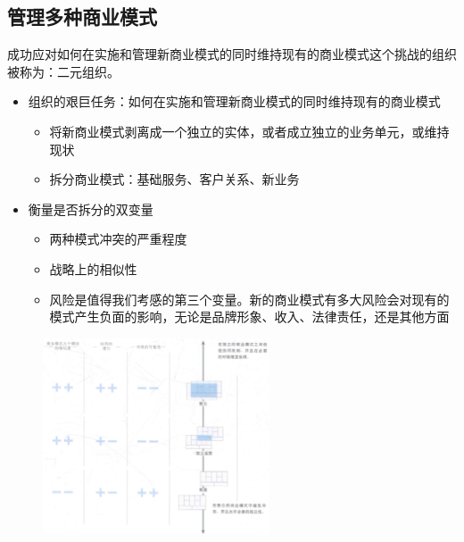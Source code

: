 \subsection{管理多种商业模式}
成功应对如何在实施和管理新商业模式的同时维持现有的商业模式这个挑战的组织被称为：二元组织。

\begin{itemize}
    \item 组织的艰巨任务：如何在实施和管理新商业模式的同时维持现有的商业模式
    \begin{itemize}
        \item 将新商业模式剥离成一个独立的实体，或者成立独立的业务单元，或维持现状
        \item 拆分商业模式：基础服务、客户关系、新业务
    \end{itemize}
    \item 衡量是否拆分的双变量
    \begin{itemize}
        \item 两种模式冲突的严重程度
        \item 战略上的相似性
        \item 风险是值得我们考感的第三个变量。新的商业模式有多大风险会对现有的模式产生负面的影响，无论是品牌形象、收入、法律责任，还是其他方面
    \end{itemize}
\end{itemize}

\begin{figure}[H]
	\centering
	\vspace{-0.5em}
	\includegraphics[width=0.6\textwidth]{img/管理多种商业模式.png}
    \vspace{-0.5em}
\end{figure}

